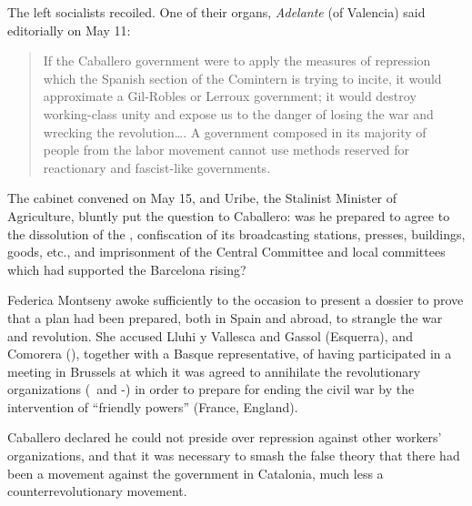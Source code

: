 \medskip

The left socialists recoiled. One of their organs, \emph{Adelante} (of Valencia) said editorially on May 11:

\begin{quotation}
  If the Caballero government were to apply the measures of repression which the Spanish section of the Comintern is trying to incite, it would approximate a Gil-Robles or Lerroux government; it would destroy working-class unity and expose us to the danger of losing the war and wrecking the revolution\dots.
  A government composed in its majority of people from the labor movement cannot use methods reserved for reactionary and fascist-like governments.
\end{quotation}

The cabinet convened on May 15, and Uribe, the Stalinist Minister of Agriculture, bluntly put the question to Caballero: was he prepared to agree to the dissolution of the \POUM\kn, confiscation of its broadcasting stations, presses, buildings, goods, etc., and imprisonment of the Central Committee and local committees which had supported the Barcelona rising?

Federica Montseny awoke sufficiently to the occasion to present a dossier to prove that a plan had been prepared, both in Spain and abroad, to strangle the war and revolution. She accused Lluhi y Vallesca and Gassol (Esquerra), and Comorera (\PSUC), together with a Basque representative, of having participated in a meeting in Brussels at which it was agreed to annihilate the revolutionary organizations (\POUM\ and \CNT-\FAI) in order to prepare for ending the civil war by the intervention of ``friendly powers'' (France, England).

Caballero declared he could not preside over repression against other workers’ organizations, and that it was necessary to smash the false theory that there had been a movement against the government in Catalonia, much less a counterrevolutionary movement.%

